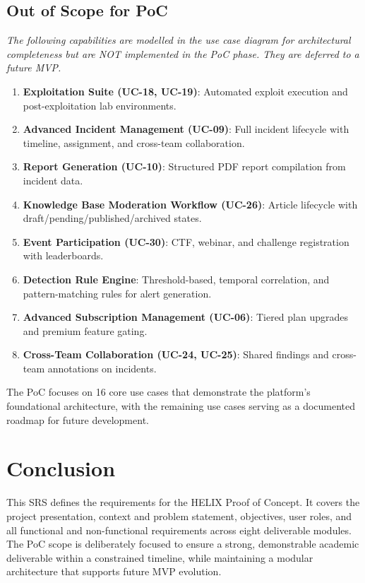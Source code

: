 \documentclass[12pt,a4paper]{report}
\begin{document}
	\section*{Out of Scope for PoC}
	\textit{The following capabilities are modelled in the use case diagram for architectural completeness but are NOT implemented in the PoC phase. They are deferred to a future MVP.}
	
	\begin{enumerate}
		\item \textbf{Exploitation Suite (UC-18, UC-19)}: Automated exploit execution and post-exploitation lab environments.
		\item \textbf{Advanced Incident Management (UC-09)}: Full incident lifecycle with timeline, assignment, and cross-team collaboration.
		\item \textbf{Report Generation (UC-10)}: Structured PDF report compilation from incident data.
		\item \textbf{Knowledge Base Moderation Workflow (UC-26)}: Article lifecycle with draft/pending/published/archived states.
		\item \textbf{Event Participation (UC-30)}: CTF, webinar, and challenge registration with leaderboards.
		\item \textbf{Detection Rule Engine}: Threshold-based, temporal correlation, and pattern-matching rules for alert generation.
		\item \textbf{Advanced Subscription Management (UC-06)}: Tiered plan upgrades and premium feature gating.
		\item \textbf{Cross-Team Collaboration (UC-24, UC-25)}: Shared findings and cross-team annotations on incidents.
	\end{enumerate}
	
	The PoC focuses on 16 core use cases that demonstrate the platform's foundational architecture, with the remaining use cases serving as a documented roadmap for future development.
	
	\chapter*{Conclusion}
	\begin{successbox}[title=Document Summary]
		This SRS defines the requirements for the HELIX Proof of Concept. It covers
		the project presentation, context and problem statement, objectives, user
		roles, and all functional and non-functional requirements across eight
		deliverable modules. The PoC scope is deliberately focused to ensure a
		strong, demonstrable academic deliverable within a constrained timeline,
		while maintaining a modular architecture that supports future MVP evolution.
	\end{successbox}
	
\end{document}
